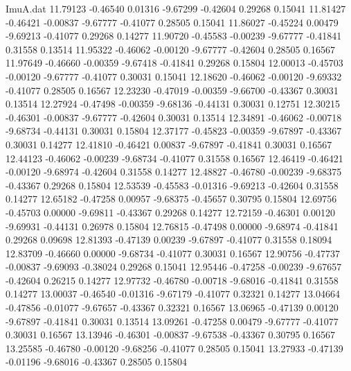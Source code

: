 \begin{filecontents}{ImuA.dat}
  11.79123   -0.46540    0.01316   -9.67299   -0.42604    0.29268    0.15041
  11.81427   -0.46421   -0.00837   -9.67777   -0.41077    0.28505    0.15041
  11.86027   -0.45224    0.00479   -9.69213   -0.41077    0.29268    0.14277
  11.90720   -0.45583   -0.00239   -9.67777   -0.41841    0.31558    0.13514
  11.95322   -0.46062   -0.00120   -9.67777   -0.42604    0.28505    0.16567
  11.97649   -0.46660   -0.00359   -9.67418   -0.41841    0.29268    0.15804
  12.00013   -0.45703   -0.00120   -9.67777   -0.41077    0.30031    0.15041
  12.18620   -0.46062   -0.00120   -9.69332   -0.41077    0.28505    0.16567
  12.23230   -0.47019   -0.00359   -9.66700   -0.43367    0.30031    0.13514
  12.27924   -0.47498   -0.00359   -9.68136   -0.44131    0.30031    0.12751
  12.30215   -0.46301   -0.00837   -9.67777   -0.42604    0.30031    0.13514
  12.34891   -0.46062   -0.00718   -9.68734   -0.44131    0.30031    0.15804
  12.37177   -0.45823   -0.00359   -9.67897   -0.43367    0.30031    0.14277
  12.41810   -0.46421    0.00837   -9.67897   -0.41841    0.30031    0.16567
  12.44123   -0.46062   -0.00239   -9.68734   -0.41077    0.31558    0.16567
  12.46419   -0.46421   -0.00120   -9.68974   -0.42604    0.31558    0.14277
  12.48827   -0.46780   -0.00239   -9.68375   -0.43367    0.29268    0.15804
  12.53539   -0.45583   -0.01316   -9.69213   -0.42604    0.31558    0.14277
  12.65182   -0.47258    0.00957   -9.68375   -0.45657    0.30795    0.15804
  12.69756   -0.45703    0.00000   -9.69811   -0.43367    0.29268    0.14277
  12.72159   -0.46301    0.00120   -9.69931   -0.44131    0.26978    0.15804
  12.76815   -0.47498    0.00000   -9.68974   -0.41841    0.29268    0.09698
  12.81393   -0.47139    0.00239   -9.67897   -0.41077    0.31558    0.18094
  12.83709   -0.46660    0.00000   -9.68734   -0.41077    0.30031    0.16567
  12.90756   -0.47737   -0.00837   -9.69093   -0.38024    0.29268    0.15041
  12.95446   -0.47258   -0.00239   -9.67657   -0.42604    0.26215    0.14277
  12.97732   -0.46780   -0.00718   -9.68016   -0.41841    0.31558    0.14277
  13.00037   -0.46540   -0.01316   -9.67179   -0.41077    0.32321    0.14277
  13.04664   -0.47856   -0.01077   -9.67657   -0.43367    0.32321    0.16567
  13.06965   -0.47139    0.00120   -9.67897   -0.41841    0.30031    0.13514
  13.09261   -0.47258    0.00479   -9.67777   -0.41077    0.30031    0.16567
  13.13946   -0.46301   -0.00837   -9.67538   -0.43367    0.30795    0.16567
  13.25585   -0.46780   -0.00120   -9.68256   -0.41077    0.28505    0.15041
  13.27933   -0.47139   -0.01196   -9.68016   -0.43367    0.28505    0.15804

\end{filecontents}
